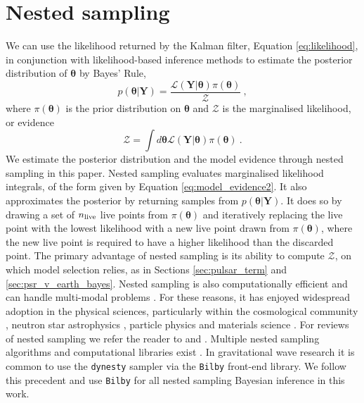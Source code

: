 \documentclass[fleqn,usenatbib,useAMS]{mnras}
\begin{document}
\section{Nested sampling}\label{sec:nested_sampling}
We can use the likelihood returned by the Kalman filter, Equation \eqref{eq:likelihood}, in conjunction with likelihood-based inference methods to estimate the posterior distribution of $\boldsymbol{\theta}$ by Bayes' Rule,
\begin{equation}
	p(\boldsymbol{\theta} | \boldsymbol{Y}) = \frac{\mathcal{L}(\boldsymbol{Y} | \boldsymbol{\theta}) \pi(\boldsymbol{\theta})}{\mathcal{Z}} \ ,
\end{equation}
where $\pi(\boldsymbol{\theta})$ is the prior distribution on $\boldsymbol{\theta}$ and $\mathcal{Z}$ is the marginalised likelihood, or evidence
\begin{equation}
	\mathcal{Z} = \int d \boldsymbol{\theta} \mathcal{L}(\boldsymbol{Y} | \boldsymbol{\theta})  \pi(\boldsymbol{\theta})  \ . \label{eq:model_evidence2}
\end{equation}
We estimate the posterior distribution and the model evidence through nested sampling \citep{Skilling} in this paper. Nested sampling evaluates marginalised likelihood integrals, of the form given by Equation \eqref{eq:model_evidence2}. It also approximates the posterior by returning samples from $p(\boldsymbol{\theta} | \boldsymbol{Y})$. It does so by drawing a set of $n_{\rm live}$ live points from $\pi(\boldsymbol{\theta})$ and iteratively replacing the live point with the lowest likelihood with a new live point drawn from $\pi(\boldsymbol{\theta})$, where the new live point is required to have a higher likelihood than the discarded point. The primary advantage of nested sampling is its ability to compute $\mathcal{Z}$, on which model selection relies, as in Sections \ref{sec:pulsar_term} and \ref{sec:psr_v_earth_bayes}. Nested sampling is also computationally efficient and can handle multi-modal problems \citep{Ashton2022}. For these reasons, it has enjoyed widespread adoption in the physical sciences, particularly within the cosmological community \citep{Mukherjee2006,Feroz2008,Handley2015}, neutron star astrophysics \citep{Myers2021MNRAS.502.3113M,Meyers2021,Melatos2023}, particle physics \citep{proceedings2019033014} and materials science \citep{2009arXiv0906materials}. For reviews of nested sampling we refer the reader to \cite{Buchner2021} and \cite{Ashton2022}. Multiple nested sampling algorithms and computational libraries exist \citep[e.g.][]{Feroz2008,Feroz2009,Handley2015,dynesty2020,UltraNest2021}. In gravitational wave research it is common to use the \texttt{dynesty} sampler \citep{dynesty2020} via the \texttt{Bilby} \citep{bilby.507.2037A} front-end library. We follow this precedent and use \texttt{Bilby} for all nested sampling Bayesian inference in this work. \newline 
\end{document}
